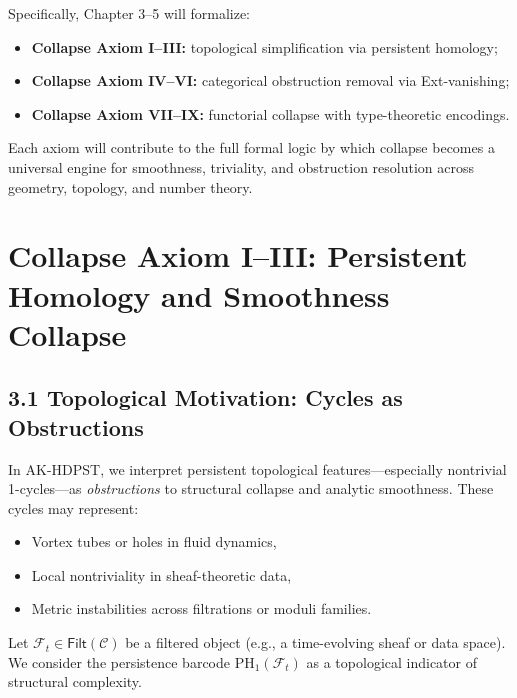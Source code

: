 \documentclass[11pt]{article}
\begin{document}
Specifically, Chapter 3–5 will formalize:

\begin{itemize}
  \item \textbf{Collapse Axiom I–III:} topological simplification via persistent homology;
  \item \textbf{Collapse Axiom IV–VI:} categorical obstruction removal via Ext-vanishing;
  \item \textbf{Collapse Axiom VII–IX:} functorial collapse with type-theoretic encodings.
\end{itemize}

Each axiom will contribute to the full formal logic by which collapse becomes a universal engine  
for smoothness, triviality, and obstruction resolution across geometry, topology, and number theory.



\section{Collapse Axiom I–III: Persistent Homology and Smoothness Collapse}

\subsection*{3.1 Topological Motivation: Cycles as Obstructions}

In AK-HDPST, we interpret persistent topological features—especially nontrivial 1-cycles—as \emph{obstructions}  
to structural collapse and analytic smoothness. These cycles may represent:

\begin{itemize}
  \item Vortex tubes or holes in fluid dynamics,
  \item Local nontriviality in sheaf-theoretic data,
  \item Metric instabilities across filtrations or moduli families.
\end{itemize}

Let \( \mathcal{F}_t \in \mathsf{Filt}(\mathcal{C}) \) be a filtered object (e.g., a time-evolving sheaf or data space).  
We consider the persistence barcode \( \mathrm{PH}_1(\mathcal{F}_t) \) as a topological indicator of structural complexity.
\end{document}
